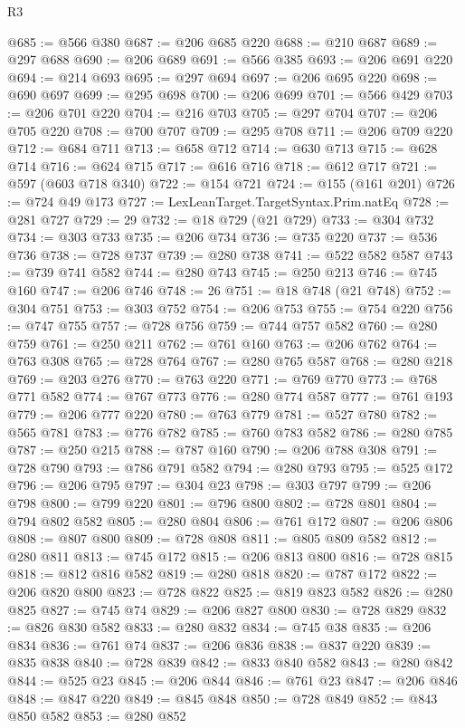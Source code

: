 \begin{lexlean}{R3}
\begin{coremodule}
@685 := @566 @380
@687 := @206 @685 @220
@688 := @210 @687
@689 := @297 @688
@690 := @206 @689
@691 := @566 @385
@693 := @206 @691 @220
@694 := @214 @693
@695 := @297 @694
@697 := @206 @695 @220
@698 := @690 @697
@699 := @295 @698
@700 := @206 @699
@701 := @566 @429
@703 := @206 @701 @220
@704 := @216 @703
@705 := @297 @704
@707 := @206 @705 @220
@708 := @700 @707
@709 := @295 @708
@711 := @206 @709 @220
@712 := @684 @711
@713 := @658 @712
@714 := @630 @713
@715 := @628 @714
@716 := @624 @715
@717 := @616 @716
@718 := @612 @717
@721 := @597 (@603 @718 @340)
@722 := @154 @721
@724 := @155 (@161 @201)
@726 := @724 @49 @173
@727 := LexLeanTarget.TargetSyntax.Prim.natEq
@728 := @281 @727
@729 := 29
@732 := @18 @729 (@21 @729)
@733 := @304 @732
@734 := @303 @733
@735 := @206 @734
@736 := @735 @220
@737 := @536 @736
@738 := @728 @737
@739 := @280 @738
@741 := @522 @582 @587
@743 := @739 @741 @582
@744 := @280 @743
@745 := @250 @213
@746 := @745 @160
@747 := @206 @746
@748 := 26
@751 := @18 @748 (@21 @748)
@752 := @304 @751
@753 := @303 @752
@754 := @206 @753
@755 := @754 @220
@756 := @747 @755
@757 := @728 @756
@759 := @744 @757 @582
@760 := @280 @759
@761 := @250 @211
@762 := @761 @160
@763 := @206 @762
@764 := @763 @308
@765 := @728 @764
@767 := @280 @765 @587
@768 := @280 @218
@769 := @203 @276
@770 := @763 @220
@771 := @769 @770
@773 := @768 @771 @582
@774 := @767 @773
@776 := @280 @774 @587
@777 := @761 @193
@779 := @206 @777 @220
@780 := @763 @779
@781 := @527 @780
@782 := @565 @781
@783 := @776 @782
@785 := @760 @783 @582
@786 := @280 @785
@787 := @250 @215
@788 := @787 @160
@790 := @206 @788 @308
@791 := @728 @790
@793 := @786 @791 @582
@794 := @280 @793
@795 := @525 @172
@796 := @206 @795
@797 := @304 @23
@798 := @303 @797
@799 := @206 @798
@800 := @799 @220
@801 := @796 @800
@802 := @728 @801
@804 := @794 @802 @582
@805 := @280 @804
@806 := @761 @172
@807 := @206 @806
@808 := @807 @800
@809 := @728 @808
@811 := @805 @809 @582
@812 := @280 @811
@813 := @745 @172
@815 := @206 @813 @800
@816 := @728 @815
@818 := @812 @816 @582
@819 := @280 @818
@820 := @787 @172
@822 := @206 @820 @800
@823 := @728 @822
@825 := @819 @823 @582
@826 := @280 @825
@827 := @745 @74
@829 := @206 @827 @800
@830 := @728 @829
@832 := @826 @830 @582
@833 := @280 @832
@834 := @745 @38
@835 := @206 @834
@836 := @761 @74
@837 := @206 @836
@838 := @837 @220
@839 := @835 @838
@840 := @728 @839
@842 := @833 @840 @582
@843 := @280 @842
@844 := @525 @23
@845 := @206 @844
@846 := @761 @23
@847 := @206 @846
@848 := @847 @220
@849 := @845 @848
@850 := @728 @849
@852 := @843 @850 @582
@853 := @280 @852

\end{coremodule}
\end{lexlean}
